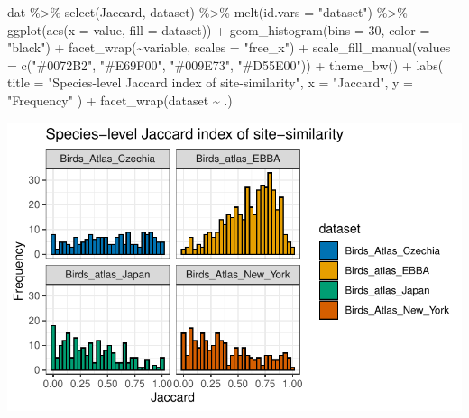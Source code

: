 \documentclass[
  letterpaper,
  DIV=11,
  numbers=noendperiod]{scrartcl}
\newenvironment{Shaded}{\begin{snugshade}}{\end{snugshade}}
\newcommand{\AttributeTok}[1]{\textcolor[rgb]{0.40,0.45,0.13}{#1}}
\newcommand{\DecValTok}[1]{\textcolor[rgb]{0.68,0.00,0.00}{#1}}
\newcommand{\FunctionTok}[1]{\textcolor[rgb]{0.28,0.35,0.67}{#1}}
\newcommand{\NormalTok}[1]{\textcolor[rgb]{0.00,0.23,0.31}{#1}}
\newcommand{\SpecialCharTok}[1]{\textcolor[rgb]{0.37,0.37,0.37}{#1}}
\newcommand{\StringTok}[1]{\textcolor[rgb]{0.13,0.47,0.30}{#1}}
\begin{document}
\begin{Shaded}
\begin{Highlighting}[]
\NormalTok{dat }\SpecialCharTok{\%\textgreater{}\%}
    \FunctionTok{select}\NormalTok{(Jaccard, dataset) }\SpecialCharTok{\%\textgreater{}\%}
    \FunctionTok{melt}\NormalTok{(}\AttributeTok{id.vars =} \StringTok{"dataset"}\NormalTok{) }\SpecialCharTok{\%\textgreater{}\%}
    \FunctionTok{ggplot}\NormalTok{(}\FunctionTok{aes}\NormalTok{(}\AttributeTok{x =}\NormalTok{ value, }\AttributeTok{fill =}\NormalTok{ dataset)) }\SpecialCharTok{+}
    \FunctionTok{geom\_histogram}\NormalTok{(}\AttributeTok{bins =} \DecValTok{30}\NormalTok{, }\AttributeTok{color =} \StringTok{"black"}\NormalTok{) }\SpecialCharTok{+}
    \FunctionTok{facet\_wrap}\NormalTok{(}\SpecialCharTok{\textasciitilde{}}\NormalTok{variable, }\AttributeTok{scales =} \StringTok{"free\_x"}\NormalTok{) }\SpecialCharTok{+}
    \FunctionTok{scale\_fill\_manual}\NormalTok{(}\AttributeTok{values =} \FunctionTok{c}\NormalTok{(}\StringTok{"\#0072B2"}\NormalTok{, }\StringTok{"\#E69F00"}\NormalTok{, }\StringTok{"\#009E73"}\NormalTok{, }\StringTok{"\#D55E00"}\NormalTok{)) }\SpecialCharTok{+}
    \FunctionTok{theme\_bw}\NormalTok{() }\SpecialCharTok{+}
    \FunctionTok{labs}\NormalTok{(}
        \AttributeTok{title =} \StringTok{"Species{-}level Jaccard index of site{-}similarity"}\NormalTok{,}
        \AttributeTok{x =} \StringTok{"Jaccard"}\NormalTok{,}
        \AttributeTok{y =} \StringTok{"Frequency"}
\NormalTok{    ) }\SpecialCharTok{+}
    \FunctionTok{facet\_wrap}\NormalTok{(dataset }\SpecialCharTok{\textasciitilde{}}\NormalTok{ .)}
\end{Highlighting}
\end{Shaded}

\includegraphics{MachineLearning_StaticPatterNN_Report_files/figure-pdf/raw-visualization-1.pdf}
\end{document}
